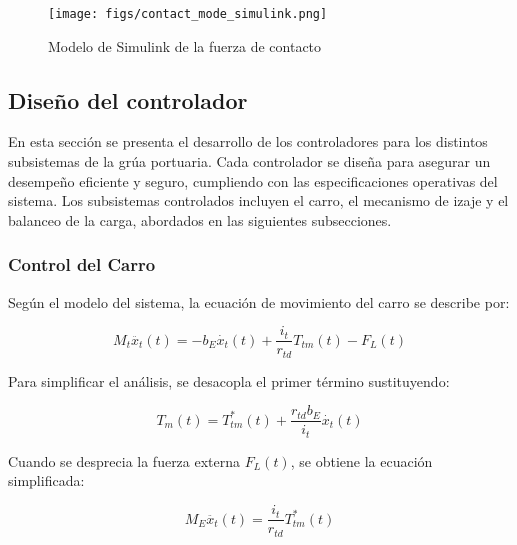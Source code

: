 \documentclass{article}
\begin{document}
                \begin{figure}
                    \centering
                    \texttt{[image: figs/contact\_mode\_simulink.png]}
                    \caption{Modelo de Simulink de la fuerza de contacto}
                    \label{fig:contact_mode_simulink}
                \end{figure}
                
        \subsection{Diseño del controlador}

            En esta sección se presenta el desarrollo de los controladores para los distintos subsistemas de la grúa portuaria. Cada controlador se diseña para asegurar un desempeño eficiente y seguro, cumpliendo con las especificaciones operativas del sistema. Los subsistemas controlados incluyen el carro, el mecanismo de izaje y el balanceo de la carga, abordados en las siguientes subsecciones.

            \subsubsection{Control del Carro} 

            Según el modelo del sistema, la ecuación de movimiento del carro se describe por:
            
            \begin{equation}
                M_t \ddot{x_{t}}(t) = - b_E \dot{x_{t}}(t) + \frac{i_t}{r_{td}} T_{tm}(t) - F_{L}(t) 
            \end{equation}
            
            Para simplificar el análisis, se desacopla el primer término sustituyendo:
            
            \begin{equation}
            T_m(t) = T_{tm}^*(t) + \frac{r_{td} b_E}{i_t} \dot{x_t}(t)
            \end{equation}
            
            Cuando se desprecia la fuerza externa $F_{L}(t)$, se obtiene la ecuación simplificada:
            
            \begin{equation}
                M_E \ddot{x_{t}}(t) =  \frac{i_t}{r_{td}} T_{tm}^*(t) 
            \end{equation}
            
\end{document}
